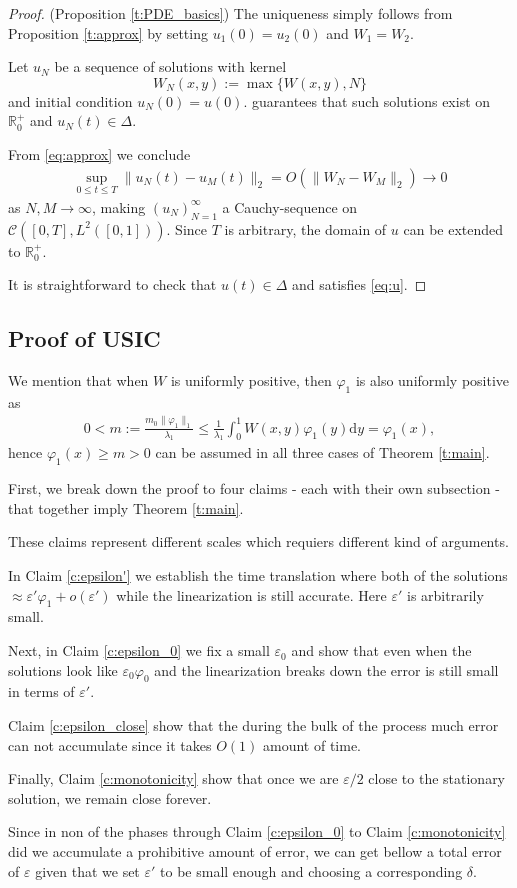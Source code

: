 \documentclass{article}
\renewcommand{\d}{\mathrm{d}}
\newcommand{\1}[1]{{\mathds{1}}_{\left\{#1\right\}}}
\newcommand{\rem}[1]{{#1}}
\begin{document}
\begin{proof}(Proposition \ref{t:PDE_basics})
	The uniqueness simply follows from Proposition \ref{t:approx} by setting $u_1(0)=u_2(0)$ and $W_1=W_2$.
	
	
	Let $u_N$ be a sequence of solutions with kernel
	$$W_{N}(x,y):=\max\{W(x,y),N\} $$
	and initial condition $u_N(0)=u(0).$  \cite[Proposition 2.9. (ii)]{SISdyn} guarantees that such solutions exist on $\mathbb{R}_{0}^{+}$ and $u_N(t) \in \Delta.$ 
	
	
	From \eqref{eq:approx} we conclude
	\begin{align*}
		\sup_{0 \leq t \leq T} \| u_N(t)-u_M(t)\|_2=O(\|W_N-W_M \|_2) \to 0
	\end{align*}
	as $N,M \to \infty$, making $\left( u_N \right)_{N=1}^{\infty}$ a Cauchy-sequence on  $\mathcal{C}\left([0,T],L^2([0,1])\right).$ Since $T$ is arbitrary, the domain of $u$ can be extended to $\mathbb{R}_{0}^{+}.$
	
	It is straightforward to check that $u(t) \in \Delta$ and satisfies \eqref{eq:u}.
\end{proof}


\subsection{Proof of USIC}
\label{s:USIC_proof}

We mention that when $W$ is uniformly positive, then $\varphi_1$ is also uniformly positive as
\begin{align*}
	0<m:=\frac{m_0\| \varphi_1 \|_1}{\lambda_1} \leq \frac{1}{\lambda_1} \int_{0}^{1}W(x,y) \varphi_1(y) \d y = \varphi_1(x),
\end{align*} 
hence $\varphi_1(x)\geq m>0$ can be assumed in all three cases of Theorem \ref{t:main}.

First, we break down the proof to four claims - each with their own subsection - that together imply Theorem \ref{t:main}. \rem{These claims represent different scales which requiers different kind of arguments.
	
In Claim \ref{c:epsilon'} we establish the time translation where both of the solutions  $\approx \varepsilon' \varphi_1+o(\varepsilon')$ while the linearization is still accurate. Here $\varepsilon'$ is arbitrarily small.

Next, in Claim \ref{c:epsilon_0} we fix a small $\varepsilon_0$ and show that even when the solutions look like $\varepsilon_0 \varphi_0$ and the linearization breaks down the error is still small in terms of $\varepsilon'$.

Claim \ref{c:epsilon_close} show that the during the bulk of the process much error can not accumulate since it takes $O(1)$ amount of time.

Finally, Claim \ref{c:monotonicity} show that once we are $\varepsilon/2$ close to the stationary solution, we remain close forever.

Since in non of the phases through Claim \ref{c:epsilon_0} to Claim \ref{c:monotonicity} did we accumulate a prohibitive amount of error, we can get bellow a total error of $\varepsilon$ given that we set $\varepsilon'$ to be small enough and choosing a corresponding $\delta$.
}
\end{document}
